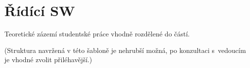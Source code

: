 \chapter{Řídící SW}

Teoretické zázemí studentské práce vhodně rozdělené do částí.

(Struktura navržená v této šabloně je nehrubší možná, po konzultaci s~vedoucím je vhodné zvolit přiléhavější.)
